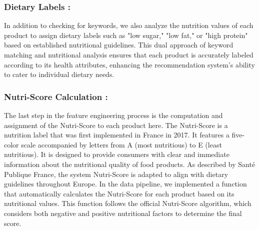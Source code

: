 \subsubsection{Dietary Labels :}

\par In addition to checking for keywords, we also analyze the nutrition values of each product to assign dietary labels such as "low sugar," "low fat," or "high protein" based on established nutritional guidelines. 
This dual approach of keyword matching and nutritional analysis ensures that each product is accurately labeled according to its health attributes, enhancing the recommendation system's ability to cater to individual dietary needs.

\subsubsection{Nutri-Score Calculation :}

\par The last step in the feature engineering process is the computation and assignment of the
Nutri-Score to each product here. The Nutri-Score is a nutrition label that was first implemented in France
in 2017. It features a five-color scale accompanied by letters from A (most
nutritious) to E (least nutritious)\cite{egnell2022impact}. It is designed to provide consumers
with clear and immediate information about the nutritional quality of
food products. As described by Santé Publique France\cite{santepubliquefrance2025nutriscore}, the system Nutri-Score is adapted to
align with dietary guidelines throughout Europe. In the data pipeline,
we implemented a function that automatically calculates the Nutri-Score
for each product based on its nutritional values. This function follows
the official Nutri-Score algorithm, which considers both negative and
positive nutritional factors to determine the final score.



